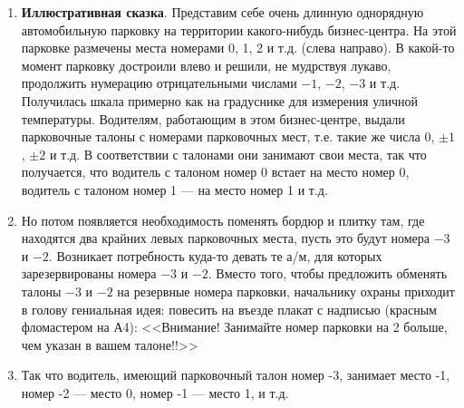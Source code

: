 

\begin{enumerate}
\item \textbf{Иллюстративная сказка}. Представим себе очень длинную однорядную автомобильную парковку на территории какого-нибудь бизнес-центра. На этой парковке размечены места номерами 0, 1, 2 и т.д. (слева направо). В какой-то момент парковку достроили влево и решили, не мудрствуя лукаво, продолжить нумерацию отрицательными числами $-1$, $-2$, $-3$ и т.д. Получилась шкала примерно как на градуснике для измерения уличной температуры. Водителям, работающим в этом бизнес-центре, выдали парковочные талоны с номерами парковочных мест, т.е. такие же числа 0, $\pm 1$, $\pm 2$ и т.д. В соответствии с талонами они занимают свои места, так что получается, что водитель с талоном номер 0 встает на место номер 0, водитель с талоном номер 1 --- на место номер 1 и т.д.
\item Но потом появляется необходимость поменять бордюр и плитку там, где находятся два крайних левых парковочных места, пусть это будут номера $-3$ и $-2$. Возникает потребность куда-то девать те а/м, для которых зарезервированы номера $-3$ и $-2$. Вместо того, чтобы предложить обменять талоны $-3$ и $-2$ на резервные номера парковки, начальнику охраны приходит в голову гениальная идея: повесить на въезде плакат с надписью (красным фломастером на А4): <<Внимание! Занимайте номер парковки на 2 больше, чем указан в вашем талоне!!>>
\item Так что водитель, имеющий парковочный талон номер -3, занимает место -1, номер -2 --- место 0, номер -1 --- место 1, и т.д.


\end{enumerate}
